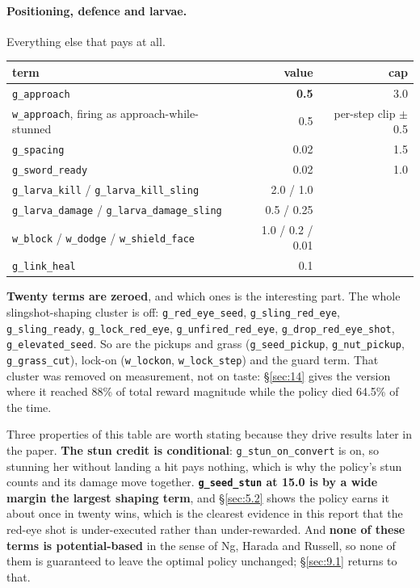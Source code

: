 \documentclass[11pt]{article}
\begin{document}
\paragraph{Positioning, defence and larvae.} Everything else that pays at all.

\begin{table}[!htbp]
  \centering
  \label{tab:themeleetasksrewardwhichisth}
\begin{center}\small
\begin{tabularx}{\linewidth}{@{}Xrr@{}}
\toprule
\textbf{term} & \textbf{value} & \textbf{cap} \\
\midrule
\texttt{g\_approach} & \textbf{0.5} & 3.0 \\
\texttt{w\_approach}, firing as approach-while-stunned & 0.5 & per-step clip $\pm$0.5 \\
\texttt{g\_spacing} & 0.02 & 1.5 \\
\texttt{g\_sword\_ready} & 0.02 & 1.0 \\
\texttt{g\_larva\_kill} / \texttt{g\_larva\_kill\_sling} & 2.0 / 1.0 &  \\
\texttt{g\_larva\_damage} / \texttt{g\_larva\_damage\_sling} & 0.5 / 0.25 &  \\
\texttt{w\_block} / \texttt{w\_dodge} / \texttt{w\_shield\_face} & 1.0 / 0.2 / 0.01 &  \\
\texttt{g\_link\_heal} & 0.1 &  \\
\bottomrule
\end{tabularx}
\end{center}
\end{table}

\textbf{Twenty terms are zeroed}, and which ones is the interesting part. The whole slingshot-shaping cluster is off: \texttt{g\_red\_eye\_seed}, \texttt{g\_sling\_red\_eye}, \texttt{g\_sling\_ready}, \texttt{g\_lock\_red\_eye}, \texttt{g\_unfired\_red\_eye}, \texttt{g\_drop\_red\_eye\_shot}, \texttt{g\_elevated\_seed}. So are the pickups and grass (\texttt{g\_seed\_pickup}, \texttt{g\_nut\_pickup}, \texttt{g\_grass\_cut}), lock-on (\texttt{w\_lockon}, \texttt{w\_lock\_step}) and the guard term. That cluster was removed on measurement, not on taste: \S\ref{sec:14} gives the version where it reached 88\% of total reward magnitude while the policy died 64.5\% of the time.

Three properties of this table are worth stating because they drive results later in the paper. \textbf{The stun credit is conditional}: \texttt{g\_stun\_on\_convert} is on, so stunning her without landing a hit pays nothing, which is why the policy's stun counts and its damage move together. \textbf{\texttt{g\_seed\_stun} at 15.0 is by a wide margin the largest shaping term}, and \S\ref{sec:5.2} shows the policy earns it about once in twenty wins, which is the clearest evidence in this report that the red-eye shot is under-executed rather than under-rewarded. And \textbf{none of these terms is potential-based} in the sense of Ng, Harada and Russell, so none of them is guaranteed to leave the optimal policy unchanged; \S\ref{sec:9.1} returns to that.
\end{document}
